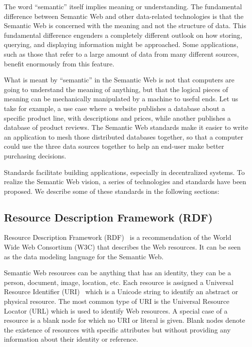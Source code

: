The word ``semantic'' itself implies meaning or understanding. The fundamental difference between Semantic Web and other data-related technologies is that the Semantic Web is concerned with the meaning and not the structure of data. This fundamental difference engenders a completely different outlook on how storing, querying, and displaying information might be approached.  Some applications, such as those that refer to a large amount of data from many different sources, benefit enormously from this feature.

What is meant by ``semantic'' in the Semantic Web is not that computers are going to understand the meaning of anything, but that the logical pieces of meaning can be mechanically manipulated by a machine to useful ends. Let us take for example, a use case where a website publishes a database about a specific product line, with descriptions and prices, while another publishes a database of product reviews. The Semantic Web standards make it easier to write an application to mesh those distributed databases together, so that a computer could use the three data sources together to help an end-user make better purchasing decisions.

Standards facilitate building applications, especially in decentralized systems. To realize the Semantic Web vision, a series of technologies and standards have been proposed. We describe some of these standards in the following sections:

\subsection{Resource Description Framework (RDF)}
Resource Description Framework (RDF)~\cite{Lassila:RDF:99} is a recommendation of the World Wide Web Consortium (W3C) that describes the Web resources. It can be seen as the data modeling language for the Semantic Web.

Semantic Web resources can be anything that has an identity, they can be a person, document, image, location, etc. Each resource is assigned a Universal Resource Identifier (URI)~\cite{Berners:RFC:05} which is a Unicode string to identify an abstract or physical resource. The most common type of URI is the Universal Resource Locator (URL) which is used to identify Web resources. A special case of a resource is a blank node for which no URI or literal is given. Blank nodes denote the existence of resources with specific attributes but without providing any information about their identity or reference.


